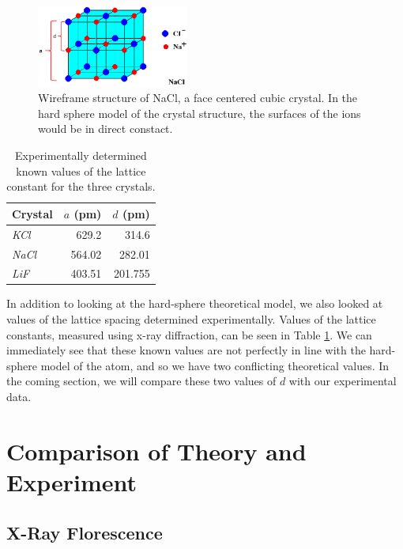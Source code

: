 \documentclass[%
 reprint,
 amsmath,amssymb,
 aps,
 pra,
]{revtex4-1}
\begin{document}
\begin{figure}[H]
	\centering
	\includegraphics[width=5cm]{nacl_lattice.png}
	\caption{Wireframe structure of NaCl, a face centered cubic crystal. In the hard sphere model of the crystal structure, the surfaces of the ions would be in direct constact.}
	\label{fig:lattice_nacl}
\end{figure}

\begin{table}[htbp]
	\begin{center}
	\begin{tabular}{|l|r|r|}
		\hline
		\textbf{Crystal} & \multicolumn{1}{l|}{\textbf{$a$ (pm)}} & \multicolumn{1}{l|}{\textbf{$d$ (pm)}} \\ \hline
		\textit{KCl} & 629.2 & 314.6 \\ \hline
		\textit{NaCl} & 564.02 & 282.01 \\ \hline
		\textit{LiF} & 403.51 & 201.755 \\ \hline
	\end{tabular}
	\end{center}
	\caption{Experimentally determined known values of the lattice constant for the three crystals.}
	\label{table:known_d}
\end{table}

In addition to looking at the hard-sphere theoretical model, we also looked at values of the lattice spacing determined experimentally. Values\cite{lattice, lattice2, lattice3} of the lattice constants, measured using x-ray diffraction, can be seen in Table \ref{table:known_d}. We can immediately see that these known values are not perfectly in line with the hard-sphere model of the atom, and so we have two conflicting theoretical values. In the coming section, we will compare these two values of $d$ with our experimental data.

\section{Comparison of Theory and Experiment}

\subsection{X-Ray Florescence}
\end{document}
